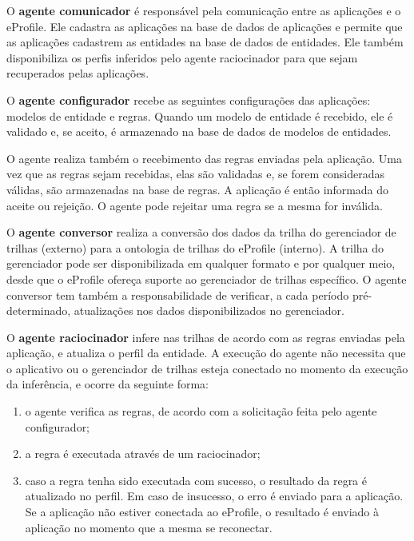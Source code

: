 O \textbf{agente comunicador} é responsável pela comunicação entre as aplicações e o eProfile. Ele cadastra as aplicações na base de dados de aplicações e permite que as aplicações cadastrem as entidades na base de dados de entidades. Ele também disponibiliza os perfis inferidos pelo agente raciocinador para que sejam recuperados pelas aplicações.

O \textbf{agente configurador} recebe as seguintes configurações das aplicações: modelos de entidade e regras. Quando um modelo de entidade é recebido, ele é validado e, se aceito, é armazenado na base de dados de modelos de entidades.

O agente realiza também o recebimento das regras enviadas pela aplicação. Uma vez que as regras sejam recebidas, elas são validadas e, se forem consideradas válidas, são armazenadas na base de regras. A aplicação é então informada do aceite ou rejeição. O agente pode rejeitar uma regra se a mesma for inválida.

O \textbf{agente conversor} realiza a conversão dos dados da trilha do gerenciador de trilhas (externo) para a ontologia de trilhas do eProfile (interno). A trilha do gerenciador pode ser disponibilizada em qualquer formato e por qualquer meio, desde que o eProfile ofereça suporte ao gerenciador de trilhas específico. O agente conversor tem também a responsabilidade de verificar, a cada período pré-determinado, atualizações nos dados disponibilizados no gerenciador.

O \textbf{agente raciocinador} infere nas trilhas de acordo com as regras enviadas pela aplicação, e atualiza o perfil da entidade. A execução do agente não necessita que o aplicativo ou o gerenciador de trilhas esteja conectado no momento da execução da inferência, e ocorre da seguinte forma:

\begin{enumerate}

\item o agente verifica as regras, de acordo com a solicitação feita pelo agente configurador;

\item a regra é executada através de um raciocinador;

\item caso a regra tenha sido executada com sucesso, o resultado da regra é atualizado no perfil. Em caso de insucesso, o erro é enviado para a aplicação. Se a aplicação não estiver conectada ao eProfile, o resultado é enviado à aplicação no momento que a mesma se reconectar.

\end{enumerate}

